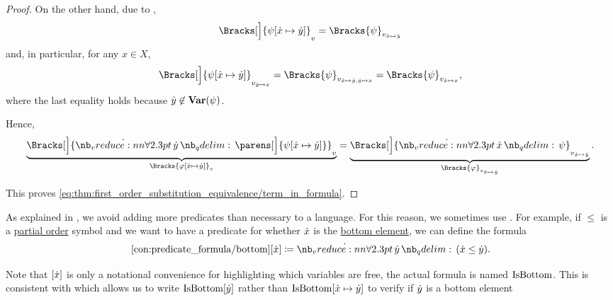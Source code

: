 \begin{proof}
  On the other hand, due to ,
  \begin{equation*}
    \Bracks[\Big]{ \psi[\synx \mapsto \syny] }_v = \Bracks{\psi}_{v_{\synx \mapsto \syny}}
  \end{equation*}
  and, in particular, for any \( x \in X \),
  \begin{equation*}
    \Bracks[\Big]{ \psi[\synx \mapsto \syny] }_{v_{\syny \mapsto x}}
    =
    \Bracks{\psi}_{v_{\synx \mapsto \syny,\syny \mapsto x}}
    =
    \Bracks{\psi}_{v_{\synx \mapsto x}},
  \end{equation*}
  where the last equality holds because \( \syny \not\in \op*{Var}(\psi) \).

  Hence,
  \begin{equation*}
    \underbrace{ \Bracks[\Big]{\qforall \syny \parens[\Big]{ \psi[\synx \mapsto \syny] } }_v }_{\Bracks{\varphi[\synx \mapsto \syny]}_v}
    =
    \underbrace{ \Bracks[\Big]{\qforall \synx \psi }_{v_{\synx \mapsto \syny}} }_{\Bracks{\varphi}_{v_{\synx \mapsto \syny}}}.
  \end{equation*}

  This proves \eqref{eq:thm:first_order_substitution_equivalence/term_in_formula}.
\end{proof}

\begin{concept}\label{con:predicate_formula}
  As explained in , we avoid adding more predicates than necessary to a language. For this reason, we sometimes use . For example, if \( \leq \) is a \hyperref[def:partially_ordered_set]{partial order} symbol and we want to have a predicate for whether \( {\dot{x}} \) is the \hyperref[def:extremal_points/top_and_bottom]{bottom element}, we can define the formula
  \begin{equation}\taglabel[\op{IsBottom}]{con:predicate_formula/bottom}
    \ref{con:predicate_formula/bottom}[\synx] \coloneqq \qforall \syny (\synx \leq \syny).
  \end{equation}

  Note that \( [{\dot{x}}] \) is only a notational convenience for highlighting which variables are free, the actual formula is named \( \op{IsBottom} \). This is consistent with  which allows us to write \( \op{IsBottom}[\syny] \) rather than \( \op{IsBottom}[\synx \mapsto \syny] \) to verify if \( {\dot{y}} \) is a bottom element
\end{concept}

